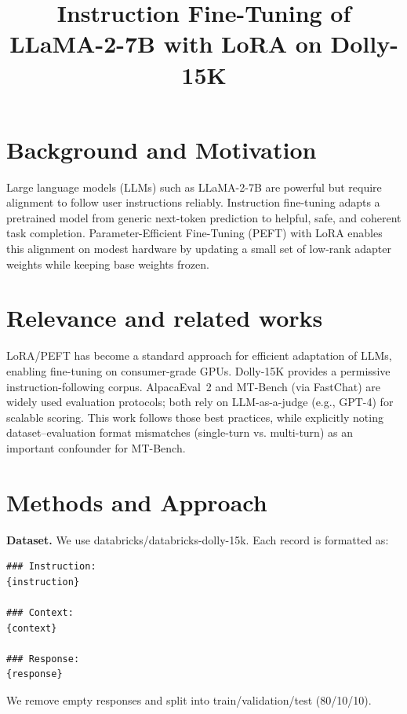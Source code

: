 \documentclass{assignment7_report}
\title{Instruction Fine-Tuning of LLaMA-2-7B with LoRA on Dolly-15K}
\author{\coord{Nauman}{(Author)}{1}}
\begin{document}
\maketitle

\section{Background and Motivation}
\vspace*{-3mm}

Large language models (LLMs) such as LLaMA-2-7B are powerful but require alignment to follow user instructions reliably. Instruction fine-tuning adapts a pretrained model from generic next-token prediction to helpful, safe, and coherent task completion. Parameter-Efficient Fine-Tuning (PEFT) with LoRA enables this alignment on modest hardware by updating a small set of low-rank adapter weights while keeping base weights frozen. 

\section{Relevance and related works}
\vspace*{-3mm}

LoRA/PEFT has become a standard approach for efficient adaptation of LLMs, enabling fine-tuning on consumer-grade GPUs. Dolly-15K provides a permissive instruction-following corpus. AlpacaEval~2 and MT-Bench (via FastChat) are widely used evaluation protocols; both rely on LLM-as-a-judge (e.g., GPT-4) for scalable scoring. This work follows those best practices, while explicitly noting dataset--evaluation format mismatches (single-turn vs. multi-turn) as an important confounder for MT-Bench.


\section{Methods and Approach}
\vspace*{-3mm}

\textbf{Dataset.} We use databricks/databricks-dolly-15k. Each record is formatted as:
\begin{verbatim}
### Instruction:
{instruction}

### Context:
{context}

### Response:
{response}
\end{verbatim}
We remove empty responses and split into train/validation/test (80/10/10).
\end{document}
